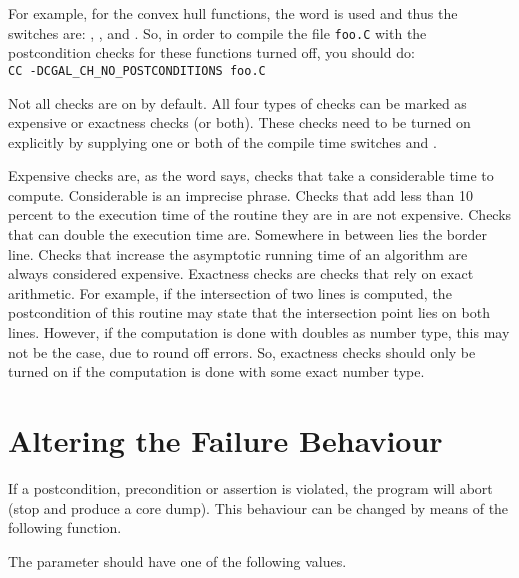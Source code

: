 For example, for the convex hull functions, the word
 is used and thus the switches are:
, 
,
 and 
.
So, in order to compile the file \verb~foo.C~ with the postcondition checks
for these functions turned off, you should do:\\
\verb~CC -DCGAL_CH_NO_POSTCONDITIONS foo.C~

Not all checks are on by default.
All four types of checks can be marked as expensive or exactness checks
(or both).
These checks need to be turned on explicitly by supplying one or both of
the compile time switches  and 
.

Expensive checks are, as the word says, checks that take a considerable
time to compute. Considerable is an imprecise phrase. 
Checks that add less than 10 percent to the execution time of the routine 
they are in are not expensive.  Checks that can double the execution time are. 
Somewhere in between lies the border line.
Checks that increase the asymptotic running time of an algorithm are always 
considered expensive.
Exactness checks are checks that rely on exact arithmetic. 
For example, if the intersection of two lines is computed, the postcondition 
of this routine may state that the intersection point lies on both lines. 
However, if the computation is done with doubles as number type, this may not 
be the case, due to round off errors. 
So, exactness checks should only be turned on if the computation is done 
with some exact number type.

\section{Altering the Failure Behaviour}

If a postcondition, precondition or assertion is
violated, the program will abort (stop and produce a core dump).
This behaviour can be changed by means of the following function.


\ccGlueBegin
{}
\ccGlueEnd

The parameter should have one of the following values.

